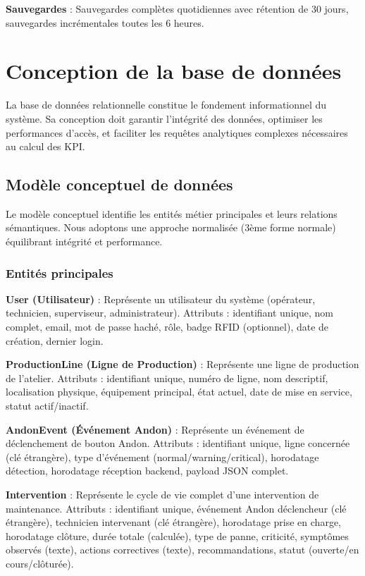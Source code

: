 \textbf{Sauvegardes} : Sauvegardes complètes quotidiennes avec rétention de 30 jours, sauvegardes incrémentales toutes les 6 heures.


\section{Conception de la base de données}

La base de données relationnelle constitue le fondement informationnel du système. Sa conception doit garantir l'intégrité des données, optimiser les performances d'accès, et faciliter les requêtes analytiques complexes nécessaires au calcul des KPI.

\subsection{Modèle conceptuel de données}

Le modèle conceptuel identifie les entités métier principales et leurs relations sémantiques. Nous adoptons une approche normalisée (3ème forme normale) équilibrant intégrité et performance.

\subsubsection{Entités principales}

\textbf{User (Utilisateur)} : Représente un utilisateur du système (opérateur, technicien, superviseur, administrateur). Attributs : identifiant unique, nom complet, email, mot de passe haché, rôle, badge RFID (optionnel), date de création, dernier login.

\textbf{ProductionLine (Ligne de Production)} : Représente une ligne de production de l'atelier. Attributs : identifiant unique, numéro de ligne, nom descriptif, localisation physique, équipement principal, état actuel, date de mise en service, statut actif/inactif.

\textbf{AndonEvent (Événement Andon)} : Représente un événement de déclenchement de bouton Andon. Attributs : identifiant unique, ligne concernée (clé étrangère), type d'événement (normal/warning/critical), horodatage détection, horodatage réception backend, payload JSON complet.


\textbf{Intervention} : Représente le cycle de vie complet d'une intervention de maintenance. Attributs : identifiant unique, événement Andon déclencheur (clé étrangère), technicien intervenant (clé étrangère), horodatage prise en charge, horodatage clôture, durée totale (calculée), type de panne, criticité, symptômes observés (texte), actions correctives (texte), recommandations, statut (ouverte/en cours/clôturée).

